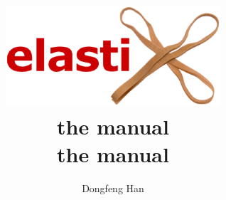 \documentclass[]{report}
\begin{document}
\title{\includegraphics[width=8cm]{elastixLogo.eps}\\\vspace{1cm}the manual\vspace{1cm}}

\title{\\\vspace{1cm}the manual\vspace{1cm}}


\author{Dongfeng Han}
\maketitle

\setcounter{page}{1}  \tableofcontents
\newpage
{} \setcounter{page}{1}









\newpage
\pagestyle{plain} 


\end{document}
